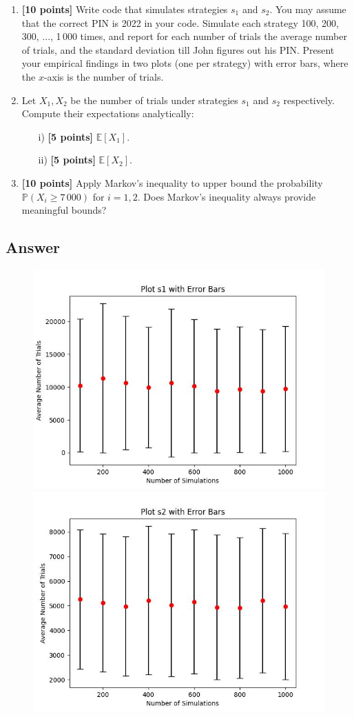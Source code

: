 \begin{tcolorbox}
\begin{enumerate}
    \item  {\bf [10 points] } Write code that simulates strategies $s_1$ and $s_2$. You may assume that the correct PIN is 2022 in your code. Simulate each strategy 100, 200, 300, ..., 1\,000 times, and report for each number of trials the average number of trials, and the standard deviation till John figures out his PIN. Present your empirical findings in two plots (one per strategy) with error bars, where the $x$-axis is the number of trials.  
    \item  Let $X_1,X_2$ be the number of trials under strategies $s_1$ and $s_2$ respectively. Compute their expectations analytically: 
    \begin{itemize}
        \item[i)]   {\bf [5 points] }$ \mathbb{E}[X_1]$.
        \item[ii)]  {\bf [5 points] } $ \mathbb{E}[X_2]$.
    \end{itemize} 


\item  {\bf [10 points] } Apply Markov's inequality to upper bound the probability $\mathbb{P}(X_i \geq 7\,000)$ for $i=1,2$.  Does Markov's inequality always provide meaningful bounds?
\end{enumerate}
\end{tcolorbox}


\subsection{Answer}
\begin{figure}[h]
 	\includegraphics[width=0.5\linewidth]{s1plot.jpeg}
	\includegraphics[width=0.5\linewidth]{s2plot.jpeg}
	\hfill
	\label{fig:label}
\end{figure}

